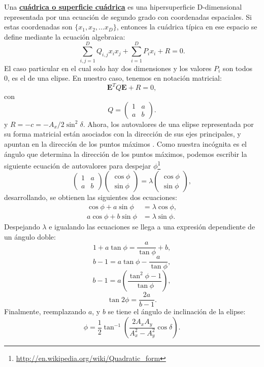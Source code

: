 Una \href{http://es.wikipedia.org/wiki/Cu\%C3\%A1drica}{\textbf{cuádrica o superficie cuádrica}} es una  hipersuperficie D-dimensional
representada por una ecuación de segundo grado con 
coordenadas espaciales. Si estas coordenadas son $\{x_1,
x_2, ... x_D\}$, entonces la cuádrica típica en ese espacio se define
mediante la ecuación algebraica: 
\[ \sum_{i,j=1}^D Q_{i,j} x_i x_j + \sum_{i=1}^D P_i x_i + R = 0. \]
El caso particular en el cual solo hay dos dimensiones y los valores
$P_i$ son todos 0, es el de una elipse. En nuestro caso, tenemos en
notación matricial:
\[ \mathbf{E}^TQ\mathbf{E} + R= 0, \]
con
\[
Q=
\begin{pmatrix}
1 & a\\
 a & b 
\end{pmatrix}.
 \]
y $R=-c = -A_x/2\sin^2{\delta}$. Ahora, los autovalores de una elipse
representada por su forma matricial están asociados con la
dirección de sus ejes principales, y apuntan en la dirección de los
puntos máximos . Como nuestra incógnita es el ángulo
que determina la dirección de los puntos máximos, podemos escribir la
siguiente ecuación de autovalores para despejar $\phi$\footnote{
\url{http://en.wikipedia.org/wiki/Quadratic_form}}
\[\begin{pmatrix}
1 & a\\
 a & b 
\end{pmatrix} 
\begin{pmatrix}
\cos{\phi}\\
 \sin{\phi} 
\end{pmatrix} =
\lambda \begin{pmatrix}
\cos{\phi}\\
 \sin{\phi} 
\end{pmatrix} ,
\]
desarrollando, se obtienen las siguientes dos ecuaciones:
\begin{align*}
\cos{\phi} +a\sin{\phi} &= \lambda\cos{\phi},\\
a\cos{\phi} +b\sin{\phi} &= \lambda\sin{\phi}.
\end{align*}
Despejando $\lambda$ e igualando las ecuaciones se llega a una
expresión dependiente de un ángulo doble:
\[1+a\tan{\phi} = \frac{a}{\tan{\phi}}+b,\]
\[b-1= a\tan{\phi} -\frac{a}{\tan{\phi}},\]
\[ b-1=a\left(\frac{\tan^2{\phi} -1}{\tan{\phi}}\right),\]
\[\tan{2\phi} =\frac{2a}{b-1}.\]
Finalmente, reemplazando $a$, y $b$ se tiene el ángulo de inclinación
de la elipse:
\begin{equation*}
\phi = \frac{1}{2}\tan^{-1}{\left(\frac{2A_xA_y}{A_x^2-A_y^2}\cos{\delta}\right)}.
\end{equation*}
